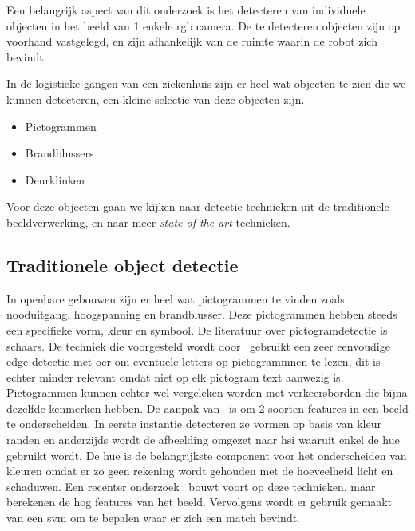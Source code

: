         Een belangrijk aspect van dit onderzoek is het detecteren van individuele objecten in het beeld van 1 enkele \gls{rgb} camera.
        De te detecteren objecten zijn op voorhand vastgelegd, en zijn afhankelijk van de ruimte waarin de robot zich bevindt.

        In de logistieke gangen van een ziekenhuis zijn er heel wat objecten te zien die we kunnen detecteren, een kleine selectie van deze objecten zijn.

        \begin{itemize}
            \item Pictogrammen
            \item Brandblussers
            \item Deurklinken
        \end{itemize}

        Voor deze objecten gaan we kijken naar detectie technieken uit de traditionele beeldverwerking, en naar meer \textit{state of the art} technieken. 


        \subsection{Traditionele object detectie} \label{sec:trad_obj_det}
            In openbare gebouwen zijn er heel wat pictogrammen te vinden zoals nooduitgang, hoogspanning en brandblusser. Deze pictogrammen hebben steeds een specifieke vorm, kleur en symbool.
            De literatuur over pictogramdetectie is schaars. De techniek die voorgesteld wordt door~\cite{swathika2016} gebruikt een zeer eenvoudige edge detectie met ocr om eventuele letters op pictogrammnen te lezen, dit is echter minder relevant omdat niet op elk pictogram text aanwezig is. Pictogrammen kunnen echter wel vergeleken worden met verkeersborden die bijna dezelfde kenmerken hebben.
            De aanpak van~\cite{Fang2003} is om 2 soorten features in een beeld te onderscheiden. In eerste instantie detecteren ze vormen op basis van kleur randen en anderzijds wordt de
            afbeelding omgezet naar \gls{hsi} waaruit enkel de hue gebruikt wordt. De hue is de belangrijkste component voor het onderscheiden van kleuren omdat er zo geen rekening wordt gehouden
            met de hoeveelheid licht en schaduwen.
            Een recenter onderzoek~\cite{Zabihi2017} bouwt voort op deze technieken,
            maar berekenen de \gls{hog} features van het beeld. Vervolgens wordt er gebruik gemaakt van een \gls{svm} om te bepalen waar er zich een match bevindt.

